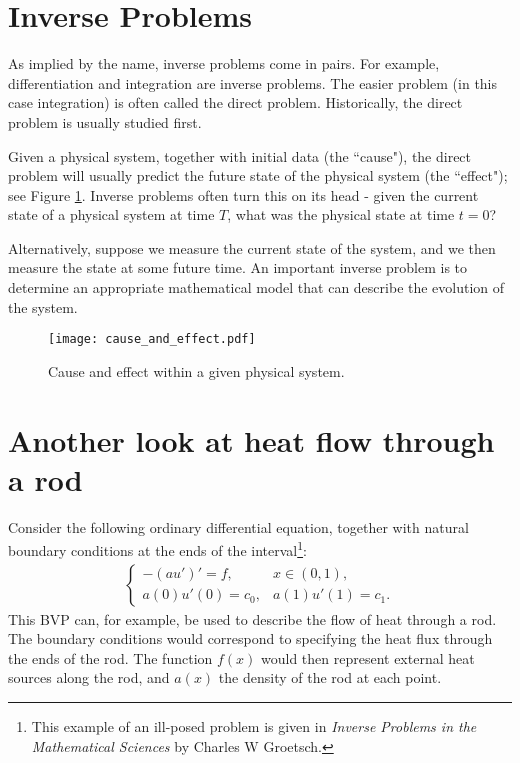 \section*{Inverse Problems}
As implied by the name, inverse problems come in pairs.
For example, differentiation and integration are inverse problems.
The easier problem (in this case integration) is often called the direct problem.
Historically, the direct problem is usually studied first.

Given a physical system, together with initial data (the ``cause"), the direct problem will usually predict the future state of the physical system (the ``effect"); see Figure \ref{fig:cause_and_effect}.
Inverse problems often turn this on its head - given the current state of a physical system at time $T$, what was the physical state at time $t = 0$?  

Alternatively, suppose we measure the current state of the system, and we then measure the state at some future time.
An important inverse problem is to determine an appropriate mathematical model that can describe the evolution of the system.

\begin{figure}
\centering
\texttt{[image: cause\_and\_effect.pdf]}
\caption{Cause and effect within a given physical system.}
\label{fig:cause_and_effect}
\end{figure}

\section*{Another look at heat flow through a rod}
Consider the following ordinary differential equation, together with natural boundary conditions at the ends of the interval\footnote{This example of an ill-posed problem is given in \textit{Inverse Problems in the Mathematical Sciences} by Charles W Groetsch.}:
\begin{align}
\begin{cases}
	-(au')' = f, & x \in (0,1),\\
	a(0)u'(0) = c_0, & a(1)u'(1) = c_1.
\end{cases} \label{inverse_problems:heat_flow}
\end{align}
This BVP can, for example, be used to describe the flow of heat through a rod.
The boundary conditions would correspond to specifying the heat flux through the ends of the rod.
The function $f(x)$ would then represent external heat sources along the rod, and $a(x)$ the density of the rod at each point. 

